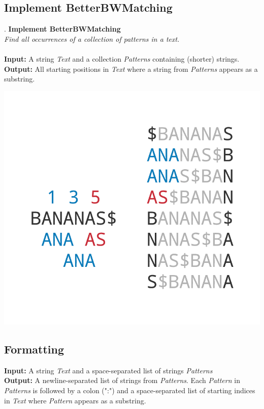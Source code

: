 \documentclass{article}
\begin{document}
\subsection{Implement BetterBWMatching}.
\hline\vspace{5}
\noindent\textbf{Implement BetterBWMatching}\\
\emph{Find all occurrences of a collection of patterns in a text.}\\ \\
\textbf{Input:} A string \emph{Text} and a collection \emph{Patterns} containing (shorter) strings. \\
\textbf{Output:} All starting positions in \emph{Text} where a string from \emph{Patterns} appears as a substring.
\begin{center}
    \includegraphics[scale=0.2]{c9/logos/9LMN.png} 
\end{center}
\hline\vspace{5}

\subsection*{Formatting}
\textbf{Input:} A string \emph{Text} and a space-separated list of strings \emph{Patterns}\\
\noindent\textbf{Output:} A newline-separated list of strings from \emph{Patterns}. Each \emph{Pattern} in \emph{Patterns} is followed by a colon (":") and a space-separated list of starting indices in \emph{Text} where \emph{Pattern} appears as a substring.
\end{document}
